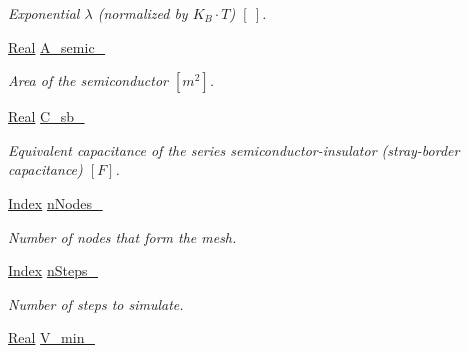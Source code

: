 \begin{DoxyCompactItemize}
\begin{DoxyCompactList}\small\item\em Exponential $ \lambda $ (normalized by $ K_B \cdot T $) $ \left[ ~ \right] $. \end{DoxyCompactList}\item 
\hypertarget{classParamList_abc3018d638813c07c11ade425d66d058}{\hyperlink{typedefs_8h_a060b837c3b4486ee35317744156f3da2}{Real} \hyperlink{classParamList_abc3018d638813c07c11ade425d66d058}{A\-\_\-semic\-\_\-}}\label{classParamList_abc3018d638813c07c11ade425d66d058}

\begin{DoxyCompactList}\small\item\em Area of the semiconductor $ \left[ m^2 \right] $. \end{DoxyCompactList}\item 
\hypertarget{classParamList_aa50ed4e92fd26b433e17e264fa82af71}{\hyperlink{typedefs_8h_a060b837c3b4486ee35317744156f3da2}{Real} \hyperlink{classParamList_aa50ed4e92fd26b433e17e264fa82af71}{C\-\_\-sb\-\_\-}}\label{classParamList_aa50ed4e92fd26b433e17e264fa82af71}

\begin{DoxyCompactList}\small\item\em Equivalent capacitance of the series semiconductor-\/insulator (stray-\/border capacitance) $ \left[ F \right] $. \end{DoxyCompactList}\item 
\hypertarget{classParamList_a574676917a0d7d70140f4ed29bb1e8b4}{\hyperlink{typedefs_8h_a2c726f8f32697958e9d6c2afecda531d}{Index} \hyperlink{classParamList_a574676917a0d7d70140f4ed29bb1e8b4}{n\-Nodes\-\_\-}}\label{classParamList_a574676917a0d7d70140f4ed29bb1e8b4}

\begin{DoxyCompactList}\small\item\em Number of nodes that form the mesh. \end{DoxyCompactList}\item 
\hypertarget{classParamList_a78ebf0df2418a1d19ac405bc86edee1e}{\hyperlink{typedefs_8h_a2c726f8f32697958e9d6c2afecda531d}{Index} \hyperlink{classParamList_a78ebf0df2418a1d19ac405bc86edee1e}{n\-Steps\-\_\-}}\label{classParamList_a78ebf0df2418a1d19ac405bc86edee1e}

\begin{DoxyCompactList}\small\item\em Number of steps to simulate. \end{DoxyCompactList}\item 
\hypertarget{classParamList_a6212d80113c5445355b66fef1e6928eb}{\hyperlink{typedefs_8h_a060b837c3b4486ee35317744156f3da2}{Real} \hyperlink{classParamList_a6212d80113c5445355b66fef1e6928eb}{V\-\_\-min\-\_\-}}\label{classParamList_a6212d80113c5445355b66fef1e6928eb}


\end{DoxyCompactItemize}
